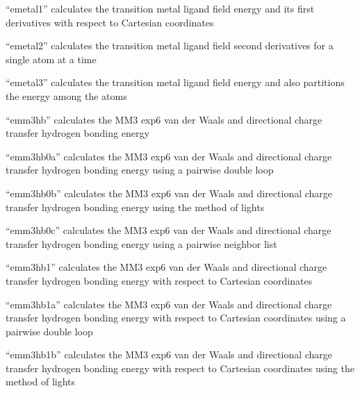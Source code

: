 \documentclass[letterpaper,11pt,english]{sphinxmanual}
\begin{document}
“emetal1” calculates the transition metal ligand field energy
and its first derivatives with respect to Cartesian coordinates


“emetal2” calculates the transition metal ligand field second
derivatives for a single atom at a time


“emetal3” calculates the transition metal ligand field energy
and also partitions the energy among the atoms


“emm3hb” calculates the MM3 exp\sphinxhyphen{}6 van der Waals and directional
charge transfer hydrogen bonding energy


“emm3hb0a” calculates the MM3 exp\sphinxhyphen{}6 van der Waals and
directional charge transfer hydrogen bonding energy using
a pairwise double loop


“emm3hb0b” calculates the MM3 exp\sphinxhyphen{}6 van der Waals and
directional charge transfer hydrogen bonding energy using
the method of lights


“emm3hb0c” calculates the MM3 exp\sphinxhyphen{}6 van der Waals and
directional charge transfer hydrogen bonding energy using
a pairwise neighbor list


“emm3hb1” calculates the MM3 exp\sphinxhyphen{}6 van der Waals and directional
charge transfer hydrogen bonding energy with respect to Cartesian
coordinates


“emm3hb1a” calculates the MM3 exp\sphinxhyphen{}6 van der Waals and directional
charge transfer hydrogen bonding energy with respect to Cartesian
coordinates using a pairwise double loop


“emm3hb1b” calculates the MM3 exp\sphinxhyphen{}6 van der Waals and directional
charge transfer hydrogen bonding energy with respect to Cartesian
coordinates using the method of lights

\end{document}
